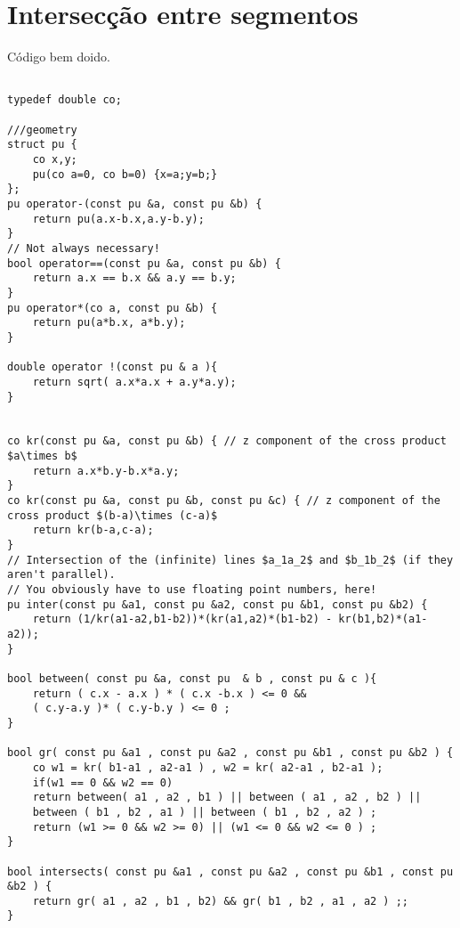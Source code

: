 \section{Intersecção entre segmentos}

Código bem doido.
\begin{multicols}{2}
	\begin{lstlisting}

typedef double co;

///geometry
struct pu {
	co x,y;
	pu(co a=0, co b=0) {x=a;y=b;}
};
pu operator-(const pu &a, const pu &b) {
	return pu(a.x-b.x,a.y-b.y);
}
// Not always necessary!
bool operator==(const pu &a, const pu &b) {
	return a.x == b.x && a.y == b.y;
}
pu operator*(co a, const pu &b) {
	return pu(a*b.x, a*b.y);
}

double operator !(const pu & a ){
	return sqrt( a.x*a.x + a.y*a.y);
}


co kr(const pu &a, const pu &b) { // z component of the cross product $a\times b$
	return a.x*b.y-b.x*a.y;
}
co kr(const pu &a, const pu &b, const pu &c) { // z component of the cross product $(b-a)\times (c-a)$
	return kr(b-a,c-a);
}
// Intersection of the (infinite) lines $a_1a_2$ and $b_1b_2$ (if they aren't parallel).
// You obviously have to use floating point numbers, here!
pu inter(const pu &a1, const pu &a2, const pu &b1, const pu &b2) {
	return (1/kr(a1-a2,b1-b2))*(kr(a1,a2)*(b1-b2) - kr(b1,b2)*(a1-a2));
}

bool between( const pu &a, const pu  & b , const pu & c ){
	return ( c.x - a.x ) * ( c.x -b.x ) <= 0 &&
	( c.y-a.y )* ( c.y-b.y ) <= 0 ;
}

bool gr( const pu &a1 , const pu &a2 , const pu &b1 , const pu &b2 ) {
	co w1 = kr( b1-a1 , a2-a1 ) , w2 = kr( a2-a1 , b2-a1 );
	if(w1 == 0 && w2 == 0)
	return between( a1 , a2 , b1 ) || between ( a1 , a2 , b2 ) ||
	between ( b1 , b2 , a1 ) || between ( b1 , b2 , a2 ) ;
	return (w1 >= 0 && w2 >= 0) || (w1 <= 0 && w2 <= 0 ) ;
}

bool intersects( const pu &a1 , const pu &a2 , const pu &b1 , const pu &b2 ) {
	return gr( a1 , a2 , b1 , b2) && gr( b1 , b2 , a1 , a2 ) ;; 
}

	\end{lstlisting}
\end{multicols}